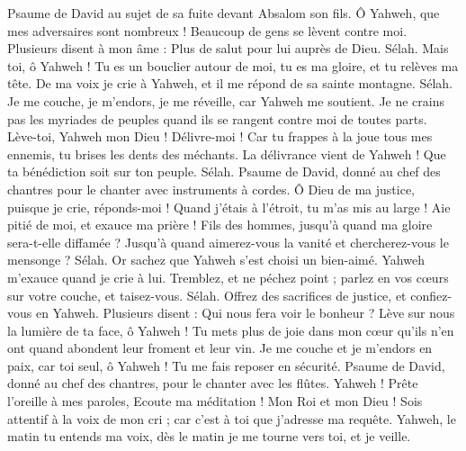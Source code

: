 \begin{multicols}{2}
\VerseOne{}Psaume de David au sujet de sa fuite devant Absalom son fils.
Ô Yahweh, que mes adversaires sont nombreux ! Beaucoup de gens se lèvent contre moi.
Plusieurs disent à mon âme : Plus de salut pour lui auprès de Dieu. Sélah.
Mais toi, ô Yahweh ! Tu es un bouclier autour de moi, tu es ma gloire, et tu relèves ma tête.
De ma voix je crie à Yahweh, et il me répond de sa sainte montagne. Sélah.
Je me couche, je m'endors, je me réveille, car Yahweh me soutient.
Je ne crains pas les myriades de peuples quand ils se rangent contre moi de toutes parts.
Lève-toi, Yahweh mon Dieu ! Délivre-moi ! Car tu frappes à la joue tous mes ennemis, tu brises les dents des méchants.
La délivrance vient de Yahweh ! Que ta bénédiction soit sur ton peuple. Sélah.
\VerseOne{}Psaume de David, donné au chef des chantres pour le chanter avec instruments à cordes.
Ô Dieu de ma justice, puisque je crie, réponds-moi ! Quand j'étais à l'étroit, tu m'as mis au large ! Aie pitié de moi, et exauce ma prière !
Fils des hommes, jusqu'à quand ma gloire sera-t-elle diffamée ? Jusqu'à quand aimerez-vous la vanité et chercherez-vous le mensonge ? Sélah.
Or sachez que Yahweh s'est choisi un bien-aimé. Yahweh m'exauce quand je crie à lui.
Tremblez, et ne péchez point ; parlez en vos cœurs sur votre couche, et taisez-vous. Sélah.
Offrez des sacrifices de justice, et confiez-vous en Yahweh.
Plusieurs disent : Qui nous fera voir le bonheur ? Lève sur nous la lumière de ta face, ô Yahweh !
Tu mets plus de joie dans mon cœur qu'ils n'en ont quand abondent leur froment et leur vin.
Je me couche et je m'endors en paix, car toi seul, ô Yahweh ! Tu me fais reposer en sécurité.
\VerseOne{}Psaume de David, donné au chef des chantres, pour le chanter avec les flûtes.
Yahweh ! Prête l'oreille à mes paroles, Ecoute ma méditation !
Mon Roi et mon Dieu ! Sois attentif à la voix de mon cri ; car c'est à toi que j'adresse ma requête.
Yahweh, le matin tu entends ma voix, dès le matin je me tourne vers toi, et je veille.

\end{multicols}
